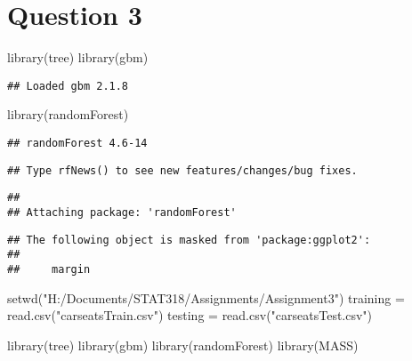 \documentclass[
]{article}
\newenvironment{Shaded}{\begin{snugshade}}{\end{snugshade}}
\newcommand{\FunctionTok}[1]{\textcolor[rgb]{0.00,0.00,0.00}{#1}}
\newcommand{\NormalTok}[1]{#1}
\newcommand{\OtherTok}[1]{\textcolor[rgb]{0.56,0.35,0.01}{#1}}
\newcommand{\StringTok}[1]{\textcolor[rgb]{0.31,0.60,0.02}{#1}}
\begin{document}
\hypertarget{question-3}{%
\section{Question 3}\label{question-3}}

\begin{Shaded}
\begin{Highlighting}[]
\FunctionTok{library}\NormalTok{(tree)}
\FunctionTok{library}\NormalTok{(gbm)}
\end{Highlighting}
\end{Shaded}

\begin{verbatim}
## Loaded gbm 2.1.8
\end{verbatim}

\begin{Shaded}
\begin{Highlighting}[]
\FunctionTok{library}\NormalTok{(randomForest)}
\end{Highlighting}
\end{Shaded}

\begin{verbatim}
## randomForest 4.6-14
\end{verbatim}

\begin{verbatim}
## Type rfNews() to see new features/changes/bug fixes.
\end{verbatim}

\begin{verbatim}
## 
## Attaching package: 'randomForest'
\end{verbatim}

\begin{verbatim}
## The following object is masked from 'package:ggplot2':
## 
##     margin
\end{verbatim}

\begin{Shaded}
\begin{Highlighting}[]
\FunctionTok{setwd}\NormalTok{(}\StringTok{"H:/Documents/STAT318/Assignments/Assignment3"}\NormalTok{)}
\NormalTok{training }\OtherTok{=} \FunctionTok{read.csv}\NormalTok{(}\StringTok{"carseatsTrain.csv"}\NormalTok{)}
\NormalTok{testing }\OtherTok{=} \FunctionTok{read.csv}\NormalTok{(}\StringTok{"carseatsTest.csv"}\NormalTok{)}
\end{Highlighting}
\end{Shaded}

\begin{Shaded}
\begin{Highlighting}[]
\FunctionTok{library}\NormalTok{(tree)}
\FunctionTok{library}\NormalTok{(gbm)}
\FunctionTok{library}\NormalTok{(randomForest)}
\FunctionTok{library}\NormalTok{(MASS)}
\end{Highlighting}
\end{Shaded}
\end{document}
